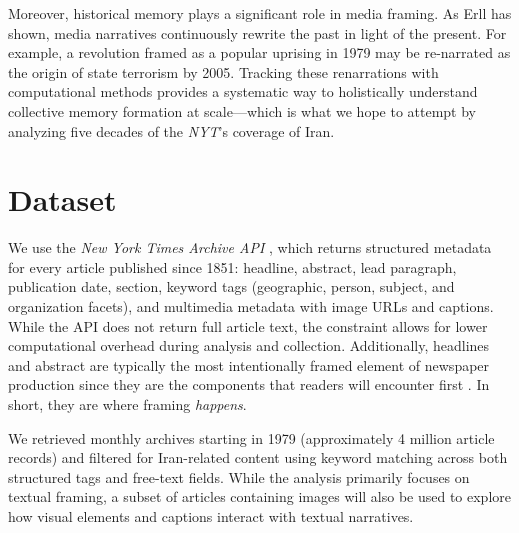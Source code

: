 \documentclass{dhnbpub}
\begin{document}

Moreover, historical memory plays a significant role in media framing. As Erll \citep{Erll2011} has shown, media narratives continuously rewrite the past in light of the present. For example, a revolution framed as a popular uprising in 1979 may be re-narrated as the origin of state terrorism by 2005. Tracking these renarrations with computational methods provides a systematic way to holistically understand collective memory formation at scale—which is what we hope to attempt by analyzing five decades of the \textit{NYT}’s coverage of Iran.


\section{Dataset}

We use the \textit{New York Times Archive API} \citep{NYTAPI}, which returns structured metadata for every article published since 1851: headline, abstract, lead paragraph, publication date, section, keyword tags (geographic, person, subject, and organization facets), and multimedia metadata with image URLs and captions. While the API does not return full article text, the constraint allows for lower computational overhead during analysis and collection. Additionally, headlines and abstract are typically the most intentionally framed element of newspaper production since they are the components that readers will encounter first \citep{Entman1993}. In short, they are where framing \textit{happens}.

We retrieved monthly archives starting in 1979 (approximately 4 million article records) and filtered for Iran-related content using keyword matching across both structured tags and free-text fields. While the analysis primarily focuses on textual framing, a subset of articles containing images will also be used to explore how visual elements and captions interact with textual narratives.
\end{document}
